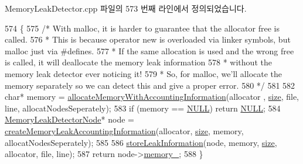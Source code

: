 Memory\+Leak\+Detector.\+cpp 파일의 573 번째 라인에서 정의되었습니다.


\begin{DoxyCode}
574 \{
575     \textcolor{comment}{/* With malloc, it is harder to guarantee that the allocator free is called.}
576 \textcolor{comment}{     * This is because operator new is overloaded via linker symbols, but malloc just via #defines.}
577 \textcolor{comment}{     * If the same allocation is used and the wrong free is called, it will deallocate the memory leak
       information}
578 \textcolor{comment}{     * without the memory leak detector ever noticing it!}
579 \textcolor{comment}{     * So, for malloc, we'll allocate the memory separately so we can detect this and give a proper error.}
580 \textcolor{comment}{     */}
581 
582     \textcolor{keywordtype}{char}* memory = \hyperlink{class_memory_leak_detector_a9f85c6601d58ad9a888439e5834ae237}{allocateMemoryWithAccountingInformation}(allocator
      , \hyperlink{gst__avb__playbin_8c_a439227feff9d7f55384e8780cfc2eb82}{size}, file, line, allocatNodesSeperately);
583     \textcolor{keywordflow}{if} (memory == \hyperlink{openavb__types__base__pub_8h_a070d2ce7b6bb7e5c05602aa8c308d0c4}{NULL}) \textcolor{keywordflow}{return} \hyperlink{openavb__types__base__pub_8h_a070d2ce7b6bb7e5c05602aa8c308d0c4}{NULL};
584     \hyperlink{struct_memory_leak_detector_node}{MemoryLeakDetectorNode}* node = 
      \hyperlink{class_memory_leak_detector_a7ee2afe61a37ef68a82228bd91643442}{createMemoryLeakAccountingInformation}(allocator, 
      \hyperlink{gst__avb__playbin_8c_a439227feff9d7f55384e8780cfc2eb82}{size}, memory, allocatNodesSeperately);
585 
586     \hyperlink{class_memory_leak_detector_ad65311ebd24859da19c751e2e42e796f}{storeLeakInformation}(node, memory, \hyperlink{gst__avb__playbin_8c_a439227feff9d7f55384e8780cfc2eb82}{size}, allocator, file, line);
587     \textcolor{keywordflow}{return} node->\hyperlink{struct_memory_leak_detector_node_a6cdb5ad30702010eaf86e4e5f26defce}{memory\_};
588 \}
\end{DoxyCode}
